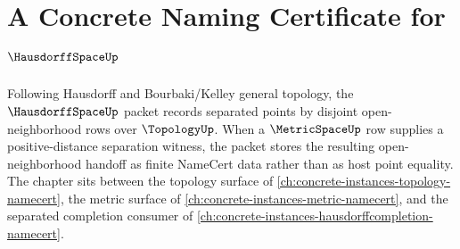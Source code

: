\chapter{A Concrete Naming Certificate for $\HausdorffSpaceUp$}
\label{ch:concrete-instances-hausdorffspace-namecert}

Following Hausdorff and Bourbaki/Kelley general topology, the $\HausdorffSpaceUp$ packet records separated points by disjoint open-neighborhood rows over $\TopologyUp$. When a $\MetricSpaceUp$ row supplies a positive-distance separation witness, the packet stores the resulting open-neighborhood handoff as finite NameCert data rather than as host point equality. The chapter sits between the topology surface of \autoref{ch:concrete-instances-topology-namecert}, the metric surface of \autoref{ch:concrete-instances-metric-namecert}, and the separated completion consumer of \autoref{ch:concrete-instances-hausdorffcompletion-namecert}.

